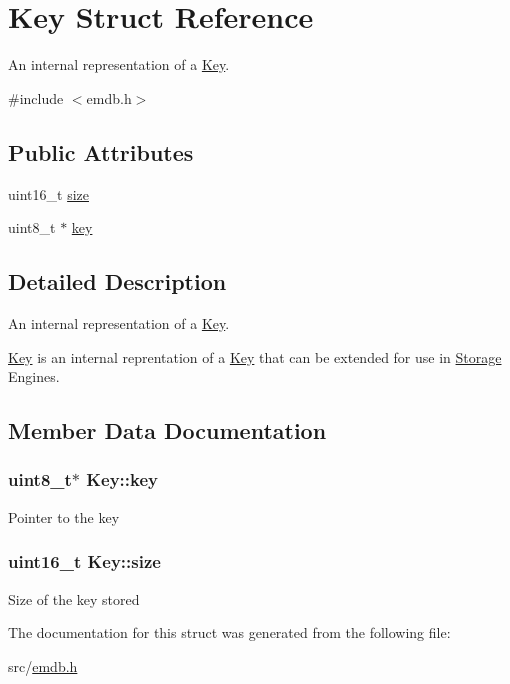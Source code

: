 \hypertarget{struct_key}{}\section{Key Struct Reference}
\label{struct_key}


An internal representation of a \hyperlink{struct_key}{Key}.  




{\ttfamily \#include $<$emdb.\+h$>$}

\subsection*{Public Attributes}
\begin{DoxyCompactItemize}
\item 
uint16\+\_\+t \hyperlink{struct_key_a817a7adb61a41a092e41a9a651e47f9d}{size}
\item 
uint8\+\_\+t $\ast$ \hyperlink{struct_key_a9dd4d2bfb90136a58a56b96ffbaaefee}{key}
\end{DoxyCompactItemize}


\subsection{Detailed Description}
An internal representation of a \hyperlink{struct_key}{Key}. 

\hyperlink{struct_key}{Key} is an internal reprentation of a \hyperlink{struct_key}{Key} that can be extended for use in \hyperlink{struct_storage}{Storage} Engines. 

\subsection{Member Data Documentation}
\hypertarget{struct_key_a9dd4d2bfb90136a58a56b96ffbaaefee}{}
\subsubsection[{key}]{\setlength{\rightskip}{0pt plus 5cm}uint8\+\_\+t$\ast$ Key\+::key}\label{struct_key_a9dd4d2bfb90136a58a56b96ffbaaefee}
Pointer to the key \hypertarget{struct_key_a817a7adb61a41a092e41a9a651e47f9d}{}
\subsubsection[{size}]{\setlength{\rightskip}{0pt plus 5cm}uint16\+\_\+t Key\+::size}\label{struct_key_a817a7adb61a41a092e41a9a651e47f9d}
Size of the key stored 

The documentation for this struct was generated from the following file\+:\begin{DoxyCompactItemize}
\item 
src/\hyperlink{emdb_8h}{emdb.\+h}\end{DoxyCompactItemize}
